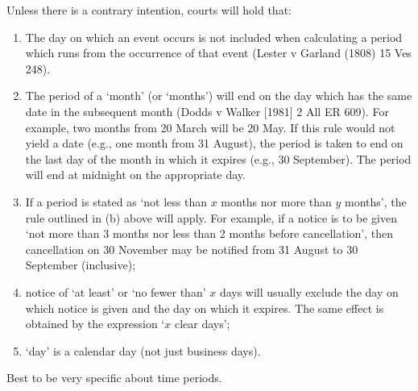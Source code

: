 \documentclass[
]{article}
\providecommand{\tightlist}{%
  \setlength{\itemsep}{0pt}\setlength{\parskip}{0pt}}
\begin{document}
Unless there is a contrary intention, courts will hold that:

\begin{enumerate}
\tightlist
\item
  The day on which an event occurs is not included when calculating a
  period which runs from the occurrence of that event (Lester v Garland
  (1808) 15 Ves 248).
\item
  The period of a `month' (or `months') will end on the day which has
  the same date in the subsequent month (Dodds v Walker {[}1981{]} 2 All
  ER 609). For example, two months from 20 March will be 20 May. If this
  rule would not yield a date (e.g., one month from 31 August), the
  period is taken to end on the last day of the month in which it
  expires (e.g., 30 September). The period will end at midnight on the
  appropriate day.
\item
  If a period is stated as `not less than {\(x\)} months nor more than
  {\(y\)} months', the rule outlined in (b) above will apply. For
  example, if a notice is to be given `not more than 3 months nor less
  than 2 months before cancellation', then cancellation on 30 November
  may be notified from 31 August to 30 September (inclusive);
\item
  notice of `at least' or `no fewer than' {\(x\)} days will usually
  exclude the day on which notice is given and the day on which it
  expires. The same effect is obtained by the expression `{\(x\)} clear
  days';
\item
  `day' is a calendar day (not just business days).
\end{enumerate}

Best to be very specific about time periods.
\end{document}
